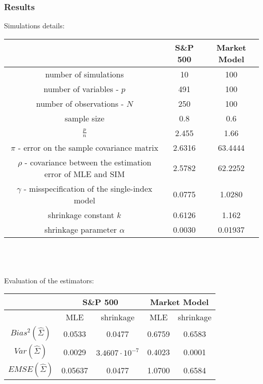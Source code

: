 \documentclass[letterpaper]{article}
\begin{document}
	\subsubsection{Results}
	Simulations details:\\
	\begin{tabular}{|c|c|c|}
		\hline 
		                               & \textbf{S\&P 500} & \textbf{Market Model} \\ 
		\hline 
		number of simulations          & 10                & 100 \\ 
		\hline 
		number of variables - \(p\)    & 491               & 100 \\
		\hline
		number of observations - \(N\) & 250               &  100 \\ 
		\hline 
		sample size                    & 0.8               & 0.6 \\
		\hline 
		\(\frac{p}{n}  \)              & 2.455             &  1.66 \\ 
		\hline 
		\(\pi\) - error on the sample covariance matrix                     & 2.6316 & 63.4444 \\
		\hline
		\(\rho\) - covariance between the estimation error of MLE and SIM   & 2.5782 & 62.2252 \\
		\hline
		\(\gamma\) - misspecification of the single-index model             & 0.0775 & 1.0280  \\
		\hline
		shrinkage constant \(k\)                                            & 0.6126 & 1.162   \\
		\hline
		shrinkage parameter    \(\alpha\)                                   & 0.0030 & 0.01937 \\
		\hline
	\end{tabular}\\
	\\
	\\
	Evaluation of the estimators:\\
	\begin{tabular}{|c|c|c|c|c|}
	\hline 
	        & \multicolumn{2}{c|}{\textbf{S\&P 500}}              & \multicolumn{2}{c|}{\textbf{Market Model}} \\ 
	\hline 
                               & MLE    & shrinkage               & MLE    & shrinkage \\
	\hline 
	\(Bias^2( \hat{\Sigma})\)  & 0.0533 & 0.0477                  & 0.6759 &  0.6583   \\ 
	\hline 
	\(Var( \hat{\Sigma})\)     & 0.0029 & \(3.4607\cdot 10^{-7}\) & 0.4023 &  0.0001   \\ 
	\hline
	\(EMSE(\hat{\Sigma})\)     & 0.05637 & 0.0477                  & 1.0700 &  0.6584    \\ 
	\hline 
	\end{tabular}\\
\end{document}
